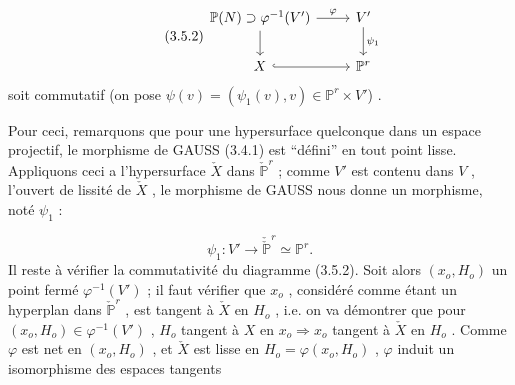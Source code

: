 \begin{equation}\tag{3.5.2}
\begin{tikzcd}
\mathbb{P}(N) \supset \varphi^{-1}(V') \arrow[r, "\varphi"] \arrow[d] & V' \arrow[d, "\psi_1"] \\
X \arrow[r, hook] & \mathbb{P}^r
\end{tikzcd}
\end{equation}
soit commutatif (on pose $\psi(v) = (\psi_1(v), v) \in \mathbb{P}^r \times V'$) .

Pour ceci, remarquons que pour une hypersurface quelconque dans un espace projectif, le morphisme de GAUSS (3.4.1) est ``défini'' en tout point lisse. Appliquons ceci a l'hypersurface $\check{X}$ dans $\check{\mathbb{P}}^r$ ; comme $V'$ est
contenu dans $V$ , l'ouvert de lissité de $\check{X}$ , le morphisme de GAUSS nous donne un morphisme, noté $\psi_1$ :

\begin{equation}\tag{3.5.3}
\psi_1 : V' \longrightarrow \check{\check{\mathbb{P}}}^r \simeq \mathbb{P}^r .
\end{equation}
Il reste à vérifier la commutativité du diagramme (3.5.2). Soit alors $(x_o, H_o)$ un point fermé $\varphi^{-1}(V')$ ; il faut vérifier que $x_o$ , considéré comme étant un hyperplan dans $\check{\mathbb{P}}^r$ , est tangent à $\check{X}$ en $H_o$ , i.e. on va démontrer que pour $(x_o, H_o) \in \varphi^{-1}(V')$ , $H_o$ tangent à $X$ en $x_o \Rightarrow x_o$ tangent à $\check{X}$ en $H_o$ . Comme $\varphi$ est net en $(x_o, H_o)$ , et $\check{X}$ est lisse en $H_o = \varphi(x_o, H_o)$ , $\varphi$ induit un isomorphisme des espaces tangents

